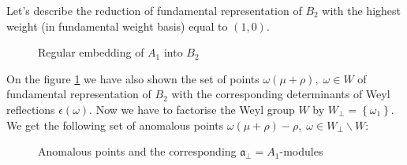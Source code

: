 \documentclass[a4paper,12pt]{article}
\theoremstyle{definition} \newtheorem{Def}{Definition}
\begin{document}
Let's describe the reduction of fundamental representation of $B_2$ with the highest weight (in fundamental weight basis) equal to $(1,0)$.
\begin{figure}[ph]
  \noindent{}
  \caption{Regular embedding of $A_1$ into $B_2$}
  \label{fig:B2_A1}
\end{figure}
On the figure \ref{fig:B2_A1} we have also shown the set of points $\omega(\mu+\rho),\; \omega\in W$ of fundamental representation of $B_2$ with the corresponding determinants of Weyl reflections $\epsilon(\omega)$. 
Now we have to factorise the Weyl group $W$ by $W_{\bot}=\left\{\omega_1\right\}$. We get the following set of anomalous points $\omega(\mu+\rho)-\rho,\; \omega\in W_{\bot}\backslash W$:
\begin{figure}[ph]
  \noindent{}
  \caption{Anomalous points and the corresponding $\mathfrak{a}_{\bot}=A_1$-modules}
  \label{fig:B2_A1_2}
\end{figure}
\end{document}
